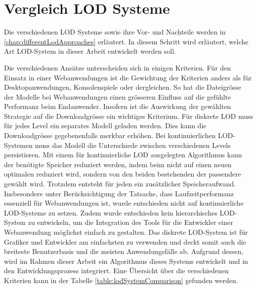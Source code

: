 \section{Vergleich LOD Systeme}
Die verschiedenen LOD Systeme sowie ihre Vor- und Nachteile werden in \autoref{chap:differentLodApproaches} erläutert. In diesem Schritt wird erläutert, welche Art LOD-System in dieser Arbeit entwickelt werden soll.

Die verschiedenen Ansätze unterscheiden sich in einigen Kriterien. Für den Einsatz in einer Webanwendungen ist die Gewichtung der Kriterien anders als für Desktopanwendungen, Konsolenspiele oder dergleichen.
So hat die Dateigrösse der Modelle bei Webanwendungen einen grösseren Einfluss auf die gefühlte Performanz beim Endanwender. Insofern ist die Auswirkung der gewählten Strategie auf die Downloadgrösse ein wichtiges Kriterium. Für diskrete LOD muss für jedes Level ein separates Modell geladen werden. Dies kann die Downloadgrösse gegebenenfalls merkbar erhöhen. Bei kontinuierlichen LOD-Systemen muss das Modell die Unterschiede zwischen verschiedenen Levels persistieren. Mit einem für kontinuierliche LOD ausgelegten Algorithmus kann der benötigte Speicher reduziert werden, indem beim  nicht auf einen neuen optimalen  reduziert wird, sondern von den beiden bestehenden  der passendere gewählt wird. Trotzdem entsteht für jeden  ein zusätzlicher Speicheraufwand.
Insbesondere unter Berücksichtigung der Tatsache, dass Laufzeitperformanz essenziell für Webanwendungen ist, wurde entschieden nicht auf kontinuierliche LOD-Systeme zu setzen.
Zudem wurde entschieden kein hierarchisches LOD-System zu entwickeln, um die Integration des Tools für die Entwickler einer Webanwendung möglichst einfach zu gestalten.
Das diskrete LOD-System ist für Grafiker und Entwickler am einfachsten zu verwenden und deckt somit auch die breiteste Benutzerbasis und die meisten Anwendungsfälle ab. Aufgrund dessen, wird im Rahmen dieser Arbeit ein Algorithmus dieses Systems entwickelt und in den Entwicklungsprozess integriert.
Eine Übersicht über die verschiedenen Kriterien kann in der Tabelle \ref{table:lodSystemComparison} gefunden werden.

